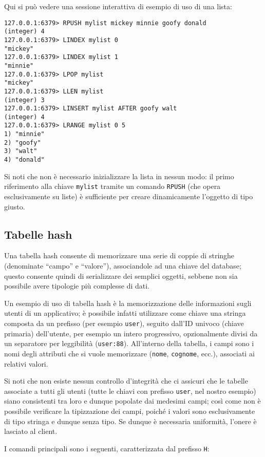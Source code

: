 Qui si può vedere una sessione interattiva di esempio di uso di una lista:

\medskip
\begin{lstlisting}
127.0.0.1:6379> RPUSH mylist mickey minnie goofy donald
(integer) 4
127.0.0.1:6379> LINDEX mylist 0
"mickey"
127.0.0.1:6379> LINDEX mylist 1
"minnie"
127.0.0.1:6379> LPOP mylist
"mickey"
127.0.0.1:6379> LLEN mylist
(integer) 3
127.0.0.1:6379> LINSERT mylist AFTER goofy walt
(integer) 4
127.0.0.1:6379> LRANGE mylist 0 5
1) "minnie"
2) "goofy"
3) "walt"
4) "donald"
\end{lstlisting}

Si noti che non è necessario inizializzare la lista in nessun modo: il primo riferimento alla chiave
\verb|mylist| tramite un comando \verb|RPUSH| (che opera esclusivamente su liste) è sufficiente
per creare dinamicamente l'oggetto di tipo giusto.

\subsection{Tabelle hash}

Una tabella hash consente di memorizzare una serie di coppie di stringhe (denominate ``campo'' e
``valore''), associandole ad una chiave del database; questo consente quindi di serializzare dei
semplici oggetti, sebbene non sia possibile avere tipologie più complesse di dati.

Un esempio di uso di tabella hash è la memorizzazione delle informazioni sugli utenti di un
applicativo; è possibile infatti utilizzare come chiave una stringa composta da un prefisso (per
esempio \verb|user|), seguito dall'ID univoco (chiave primaria) dell'utente, per esempio un intero
progressivo, opzionalmente divisi da un separatore per leggibilità (\verb|user:88|). All'interno
della tabella, i campi sono i nomi degli attributi che si vuole memorizzare (\verb|nome|,
\verb|cognome|, ecc.), associati ai relativi valori.

Si noti che non esiste nessun controllo d'integrità che ci assicuri che le tabelle associate a tutti
gli utenti (tutte le chiavi con prefisso \verb|user|, nel nostro esempio) siano consistenti tra loro
e dunque popolate dai medesimi campi; così come non è possibile verificare la tipizzazione dei
campi, poiché i valori sono esclusivamente di tipo stringa e dunque senza tipo. Se dunque è
necessaria uniformità, l'onere è lasciato al client.

I comandi principali sono i seguenti, caratterizzata dal prefisso \verb|H|:

